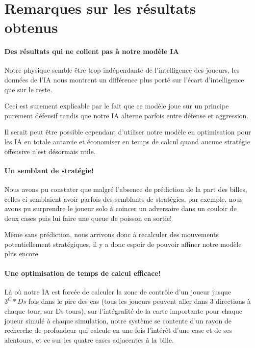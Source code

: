 	\section{Remarques sur les résultats obtenus}
	
		\paragraph{Des résultats qui ne collent pas à notre modèle IA}
		Notre physique semble être trop indépendante de l'intelligence des joueurs, les données de l'IA nous montrent un différence plus porté sur l'écart d'intelligence que sur le reste.
		
		Ceci est surement explicable par le fait que ce modèle joue sur un principe purement défensif tandis que notre IA alterne parfois entre défense et aggression.
		\begin{result}
			Il serait peut être possible cependant d'utiliser notre modèle en optimisation pour les IA en totale autarcie et économiser en temps de calcul quand aucune stratégie offensive n'est désormais utile.
		\end{result}
	
		\paragraph{Un semblant de stratégie!}
		Nous avons pu constater que malgré l'absence de prédiction de la part des billes, celles ci semblaient avoir parfois des semblants de stratégies, par exemple, nous avons pu surprendre le joueur solo à coincer un adversaire dans un couloir de deux cases puis lui faire une queue de poisson en sortie!
		
		Même sans prédiction, nous arrivons donc à recalculer des mouvements potentiellement stratégiques, il y a donc espoir de pouvoir affiner notre modèle plus encore.
		
		\paragraph{Une optimisation de temps de calcul efficace!}
		Là où notre IA est forcée de calculer la zone de contrôle d'un joueur jusque $3^C*Ds$ fois dans le pire des cas (tous les joueurs peuvent aller dans 3 directions à chaque tour, sur Ds tours), sur l'intégralité de la carte importante pour chaque joueur simulé à chaque simulation, notre système se contente d'un rayon de recherche de profondeur qui calcule en une fois l'intérêt d'une case et de ses alentours, et ce sur les quatre cases adjacentes à la bille.
		
